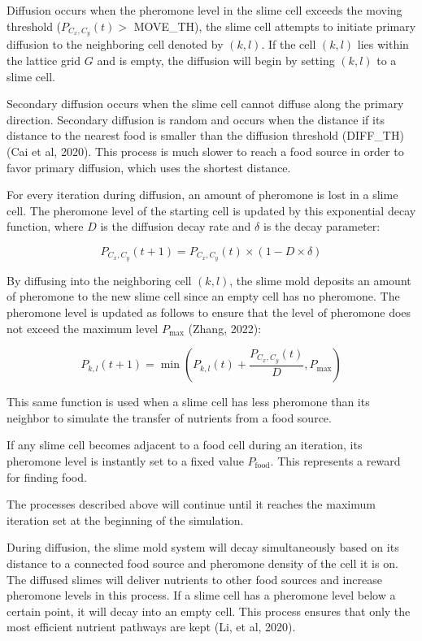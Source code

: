 \documentclass[11pt]{article}
\begin{document}
Diffusion occurs when the pheromone level in the slime cell exceeds the
moving threshold (\(P_{C_{x},C_{y}}(t) >\) MOVE\_TH), the slime cell
attempts to initiate primary diffusion to the neighboring cell denoted
by \((k,l)\). If the cell \((k,l)\) lies within the lattice grid \(G\)
and is empty, the diffusion will begin by setting \((k,l)\) to a slime
cell.

Secondary diffusion occurs when the slime cell cannot diffuse along the
primary direction. Secondary diffusion is random and occurs when the
distance if its distance to the nearest food is smaller than the
diffusion threshold (DIFF\_TH) (Cai et al, 2020). This process is much
slower to reach a food source in order to favor primary diffusion, which
uses the shortest distance.

For every iteration during diffusion, an amount of pheromone is lost in
a slime cell. The pheromone level of the starting cell is updated by
this exponential decay function, where \(D\) is the diffusion decay rate
and \(\delta\) is the decay parameter:

\[P_{C_{x},C_{y}}(t + 1) = P_{C_{x},C_{y}}(t) \times (1 - D \times \delta)\]

By diffusing into the neighboring cell \((k,l)\), the slime mold
deposits an amount of pheromone to the new slime cell since an empty
cell has no pheromone. The pheromone level is updated as follows to
ensure that the level of pheromone does not exceed the maximum level
\(P_{\max}\) (Zhang, 2022):

\[P_{k,l}(t + 1) = \min\left( P_{k,l}(t) + \frac{P_{C_{x},C_{y}}(t)}{D},P_{\max} \right)\]

This same function is used when a slime cell has less pheromone than its
neighbor to simulate the transfer of nutrients from a food source.

If any slime cell becomes adjacent to a food cell during an iteration,
its pheromone level is instantly set to a fixed value
\(P_{\text{food}}\). This represents a reward for finding food.

The processes described above will continue until it reaches the maximum
iteration set at the beginning of the simulation.

During diffusion, the slime mold system will decay simultaneously based
on its distance to a connected food source and pheromone density of the
cell it is on. The diffused slimes will deliver nutrients to other food
sources and increase pheromone levels in this process. If a slime cell
has a pheromone level below a certain point, it will decay into an empty
cell. This process ensures that only the most efficient nutrient
pathways are kept (Li, et al, 2020).
\end{document}
